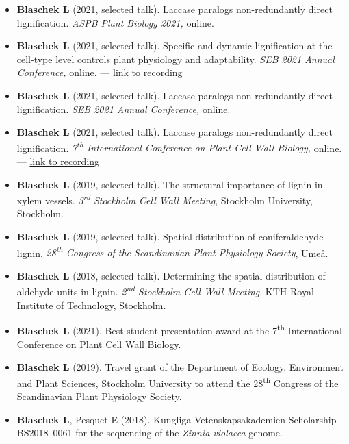 \documentclass[11pt]{article}
\begin{document}
\vspace{-0.175cm}
\begin{itemize}[label={},itemindent=-9pt,leftmargin=24pt]
	\itemsep-0.1cm
	\item \textbf{Blaschek L} (2021, selected talk). Laccase paralogs non-redundantly direct lignification. \textit{ASPB Plant Biology 2021,} online.
	\item \textbf{Blaschek L} (2021, selected talk). Specific and dynamic lignification at the cell-type level controls plant physiology and adaptability. \textit{SEB 2021 Annual Conference,} online. --- \href{https://leonardblaschek.github.io/talks.html}{link to recording}
	\item \textbf{Blaschek L} (2021, selected talk). Laccase paralogs non-redundantly direct lignification. \textit{SEB 2021 Annual Conference,} online.
	\item \textbf{Blaschek L} (2021, selected talk). Laccase paralogs non-redundantly direct lignification. \textit{7\textsuperscript{th} International Conference on Plant Cell Wall Biology,} online. --- \href{https://leonardblaschek.github.io/talks.html}{link to recording}
	\item \textbf{Blaschek L} (2019, selected talk). The structural importance of lignin in xylem vessels. \textit{3\textsuperscript{rd} Stockholm Cell Wall Meeting}, Stockholm University, Stockholm.
	\item \textbf{Blaschek L} (2019, selected talk). Spatial distribution of coniferaldehyde lignin. \textit{28\textsuperscript{th} Congress of the Scandinavian Plant Physiology Society}, Umeå.
	\item \textbf{Blaschek L} (2018, selected talk). Determining the spatial distribution of aldehyde units in lignin. \textit{2\textsuperscript{nd} Stockholm Cell Wall Meeting}, KTH Royal Institute of Technology, Stockholm.
\end{itemize}
\vspace{0.3cm}

\vspace{-0.175cm}
\begin{itemize}[label={},itemindent=-9pt,leftmargin=24pt]
	\itemsep-0.1cm
	\item \textbf{Blaschek L} (2021). Best student presentation award at the 7\textsuperscript{th} International Conference on Plant Cell Wall Biology.
	\item \textbf{Blaschek L} (2019). Travel grant of the Department of Ecology, Environment and Plant Sciences, Stockholm University to attend the 28\textsuperscript{th} Congress of the Scandinavian Plant Physiology Society.
	\item \textbf{Blaschek L}, Pesquet E (2018). Kungliga Vetenskapsakademien Scholarship BS2018--0061 for the sequencing of the \textit{Zinnia violacea} genome. 
\end{itemize}
\vspace{0.3cm}
\end{document}
